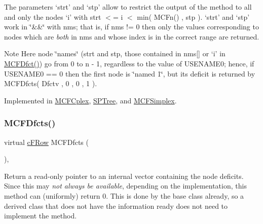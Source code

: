The parameters `strt' and `stp' allow to restrict the output of the method to all and only the nodes `i' with strt $<$= i $<$ min( M\+C\+Fn() , stp ). `strt' and `stp' work in \char`\"{}\&\&\char`\"{} with nms; that is, if nms != 0 then only the values corresponding to nodes which are {\itshape both} in nms and whose index is in the correct range are returned.

\begin{DoxyNote}{Note}
Here node \char`\"{}names\char`\"{} (strt and stp, those contained in nms\mbox{[}\mbox{]} or `i' in \mbox{\hyperlink{class_m_c_f_class_a81e07cb46404db5a9fd83075a0908208}{M\+C\+F\+Dfct()}}) go from 0 to n -\/ 1, regardless to the value of U\+S\+E\+N\+A\+M\+E0; hence, if U\+S\+E\+N\+A\+M\+E0 == 0 then the first node is \char`\"{}named 1\char`\"{}, but its deficit is returned by M\+C\+F\+Dfcts( Dfctv , 0 , 0 , 1 ). 
\end{DoxyNote}


Implemented in \mbox{\hyperlink{class_m_c_f_cplex_ad733f5fefcf64289d412534d229ff26f}{M\+C\+F\+Cplex}}, \mbox{\hyperlink{class_s_p_tree_a5931fae93a24401ed943ec1f5c0cb18f}{S\+P\+Tree}}, and \mbox{\hyperlink{class_m_c_f_simplex_ad733f5fefcf64289d412534d229ff26f}{M\+C\+F\+Simplex}}.

\mbox{\label{class_m_c_f_class_ad7e8d115e0f2bd90e1b65a573cb46ae4}} 
\subsubsection{\texorpdfstring{M\+C\+F\+Dfcts()}{MCFDfcts()}\hspace{0.1cm}{\footnotesize\ttfamily [2/2]}}
{\footnotesize\ttfamily virtual \mbox{\hyperlink{class_m_c_f_class_ad325f3193dbba0ddef1da4e72d29eda6}{c\+F\+Row}} M\+C\+F\+Dfcts (\begin{DoxyParamCaption}\item[{void}]{ }\end{DoxyParamCaption})\hspace{0.3cm}{\ttfamily [inline]}, {\ttfamily [virtual]}}

Return a read-\/only pointer to an internal vector containing the node deficits. Since this may {\itshape not always be available}, depending on the implementation, this method can (uniformly) return 0. This is done by the base class already, so a derived class that does not have the information ready does not need to implement the method.


